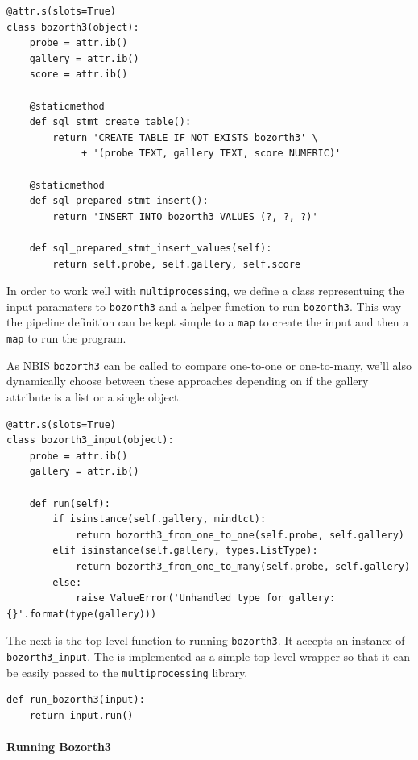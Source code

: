 \begin{lstlisting}
@attr.s(slots=True)
class bozorth3(object):
    probe = attr.ib()
    gallery = attr.ib()
    score = attr.ib()

    @staticmethod
    def sql_stmt_create_table():
        return 'CREATE TABLE IF NOT EXISTS bozorth3' \
             + '(probe TEXT, gallery TEXT, score NUMERIC)'

    @staticmethod
    def sql_prepared_stmt_insert():
        return 'INSERT INTO bozorth3 VALUES (?, ?, ?)'

    def sql_prepared_stmt_insert_values(self):
        return self.probe, self.gallery, self.score
\end{lstlisting}

In order to work well with \texttt{multiprocessing}, we define a class
representuing the input paramaters to \texttt{bozorth3} and a helper
function to run \texttt{bozorth3}. This way the pipeline definition can
be kept simple to a \texttt{map} to create the input and then a
\texttt{map} to run the program.

As NBIS \texttt{bozorth3} can be called to compare one-to-one or
one-to-many, we'll also dynamically choose between these approaches
depending on if the gallery attribute is a list or a single object.

\begin{lstlisting}
@attr.s(slots=True)
class bozorth3_input(object):
    probe = attr.ib()
    gallery = attr.ib()

    def run(self):
        if isinstance(self.gallery, mindtct):
            return bozorth3_from_one_to_one(self.probe, self.gallery)
        elif isinstance(self.gallery, types.ListType):
            return bozorth3_from_one_to_many(self.probe, self.gallery)
        else:
            raise ValueError('Unhandled type for gallery: {}'.format(type(gallery)))
\end{lstlisting}

The next is the top-level function to running \texttt{bozorth3}. It
accepts an instance of \texttt{bozorth3\_input}. The is implemented as a
simple top-level wrapper so that it can be easily passed to the
\texttt{multiprocessing} library.

\begin{lstlisting}
def run_bozorth3(input):
    return input.run()
\end{lstlisting}

\paragraph{Running Bozorth3}\label{running-bozorth3}

